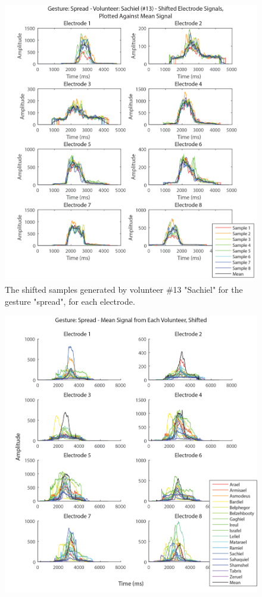\documentclass[journal]{IEEEtran}
\begin{document}
    \begin{figure}[p]
    \centering
    \includegraphics[width=1\columnwidth]{EMG/Spread_Max_Sachiel_Shifted}
    \caption{The shifted samples generated by volunteer \#13 "Sachiel" for the gesture "spread", for each electrode.}
    \label{Spread_Max_Sachiel_Shifted}
    \end{figure}
    
    \begin{figure}[H]
    \centering
    \includegraphics[width=1\columnwidth]{EMG/Spread_MeanofMeans}
    \caption{}
    \label{Spread_MeanofMeans}
    \end{figure}
    
\end{document}
